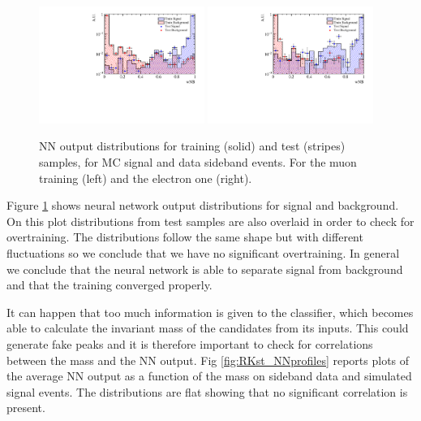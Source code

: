 \begin{figure}
\centering
\includegraphics[width=0.48\textwidth]{RKst/figs/Training/MM_wNB_TrainAndTest.pdf}
\includegraphics[width=0.48\textwidth]{RKst/figs/Training/EE_wNB_TrainAndTest.pdf}

\caption{NN output distributions for training (solid) and test (stripes) samples, for MC signal and data sideband events.
For the muon training (left) and the electron one (right).}
\label{fig:RKst_nnDist}
\end{figure}

Figure \ref{fig:RKst_nnDist} shows neural network output distributions for signal and background.
On this plot distributions from test samples are also overlaid in order to check for overtraining. 
The distributions follow the same shape but with different fluctuations so we conclude that we have no
significant overtraining. In general we conclude that the neural network is able to separate signal
from background and that the training converged properly.

It can happen that too much information is given to the classifier, which becomes able to 
calculate the invariant mass of the candidates from its inputs. This could generate fake peaks and it is therefore
important to check for correlations between the \Bz mass and the NN output.  Fig \ref{fig:RKst_NNprofiles} reports
plots of the average NN output as a function of the \Bz mass on sideband data and simulated signal events.
The distributions are flat showing that no significant correlation is present.

